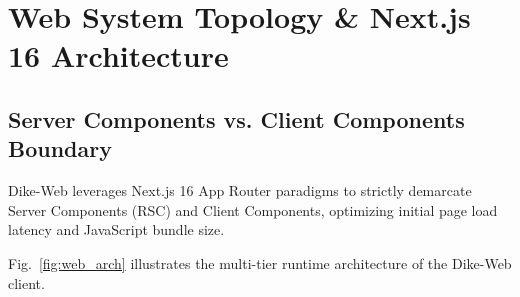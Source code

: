 \documentclass[conference,10pt,a4paper]{IEEEtran}
\begin{document}
\section{Web System Topology \& Next.js 16 Architecture}

\subsection{Server Components vs. Client Components Boundary}
Dike-Web leverages Next.js 16 App Router paradigms to strictly demarcate Server Components (RSC) and Client Components, optimizing initial page load latency and JavaScript bundle size.

Fig.~\ref{fig:web_arch} illustrates the multi-tier runtime architecture of the Dike-Web client.
\end{document}
